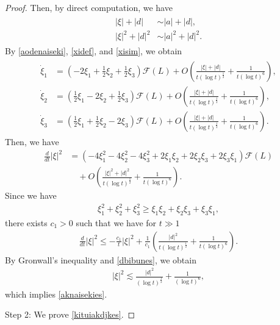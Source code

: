 \documentclass[reqno]{amsart}
\theoremstyle{plain}
\theoremstyle{definition}
\numberwithin{equation}{section}
\newcommand{\1}{\mathbbm{1}}
\begin{document}
\begin{proof}
Then, by direct computation, we have
\begin{align}\label{xisim}
\begin{aligned}
|\xi|+|d|&\sim |a|+|d|,
\\
|\xi|^2+|d|^2&\sim |a|^2+|d|^2.
\end{aligned}
\end{align}
By \eqref{aodenaiseki}, \eqref{xidef}, and \eqref{xisim}, we obtain
\begin{align}\label{xiode}
\begin{aligned}
\dot{\xi}_1&=\left(-2\xi_1+\frac{1}{2}\xi_2+\frac{1}{2}\xi_3\right)\mathcal{F}(L)+O\left(\frac{|\xi|+|d|}{t(\log{t})^{\frac{1}{2}}}+\frac{1}{t(\log{t})^6}\right),
\\
\dot{\xi}_2&=\left(\frac{1}{2}\xi_1-2\xi_2+\frac{1}{2}\xi_3\right)\mathcal{F}(L)+O\left(\frac{|\xi|+|d|}{t(\log{t})^{\frac{1}{2}}}+\frac{1}{t(\log{t})^6}\right),
\\
\dot{\xi}_3&=\left(\frac{1}{2}\xi_1+\frac{1}{2}\xi_2-2\xi_3\right)\mathcal{F}(L)+O\left(\frac{|\xi|+|d|}{t(\log{t})^{\frac{1}{2}}}+\frac{1}{t(\log{t})^6}\right).
\end{aligned}
\end{align}
Then, we have
\begin{align*}
\frac{d}{dt}|\xi|^2&=\left(-4\xi_1^2-4\xi_2^2-4\xi_3^2+2\xi_1\xi_2+2\xi_2\xi_3+2\xi_3\xi_1\right)\mathcal{F}(L)
\\
&\quad+O\left(\frac{|\xi|^2+|d|^2}{t(\log{t})^{\frac{1}{2}}}+\frac{1}{t(\log{t})^6}\right).
\end{align*}
Since we have
\begin{align*}
\xi_1^2+\xi_2^2+\xi_3^2\geq \xi_1\xi_2+\xi_2\xi_3+\xi_3\xi_1,
\end{align*}
there exists $c_1>0$ such that we have for $t\gg 1$
\begin{align}\label{xiodees}
\frac{d}{dt}|\xi|^2\leq -\frac{c_1}{t}|\xi|^2+\frac{1}{c_1}\left(\frac{|d|^2}{t(\log{t})^{\frac{1}{2}}}+\frac{1}{t(\log{t})^6}\right).
\end{align}
By Gronwall's inequality and \eqref{dbibunes}, we obtain
\begin{align*}
|\xi|^2\lesssim \frac{|d|^2}{(\log{t})^{\frac{1}{2}}}+\frac{1}{(\log{t})^6},
\end{align*}
which implies \eqref{aknaisekies}. 


Step 2: We prove \eqref{kituiakdjkes}.


\end{proof}
\end{document}

